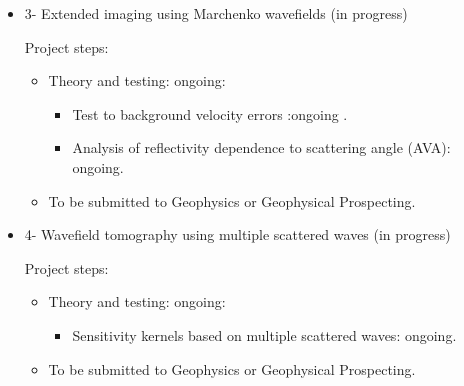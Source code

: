 \begin{itemize}
        
  \item {3- Extended imaging using Marchenko wavefields (in progress) }


        Project steps: 
          \begin{itemize}
            \item Theory and testing: ongoing:
            \begin{itemize}
                \item Test to background velocity errors :ongoing .
                \item Analysis of reflectivity dependence to scattering angle (AVA): ongoing.
            \end{itemize}  
            \item To be submitted to Geophysics or Geophysical Prospecting.
          \end{itemize}  

  \item {4- Wavefield tomography using multiple scattered waves (in progress) } 


        Project steps: 
          \begin{itemize}
            \item Theory and testing: ongoing:
            \begin{itemize}
                \item Sensitivity kernels based on multiple scattered waves: ongoing.
            \end{itemize}  
            \item To be submitted to Geophysics or Geophysical Prospecting.
          \end{itemize}  

\end{itemize}
